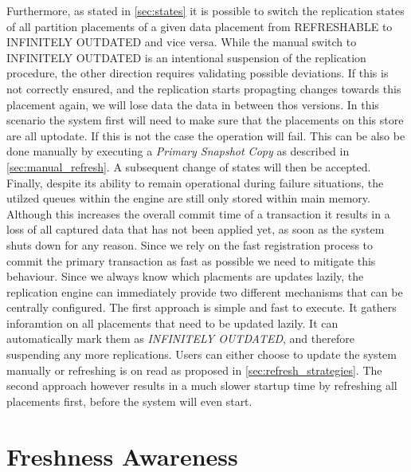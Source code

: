 Furthermore, as stated in \ref{sec:states} it is possible to switch the replication states of all partition placements of a given data placement from REFRESHABLE to 
INFINITELY OUTDATED and vice versa.
While the manual switch to INFINITELY OUTDATED is an intentional suspension of the replication procedure, the other direction requires validating possible deviations.
If this is not correctly ensured, and the replication starts propagting changes towards this placement again, we will lose data the data in between thos versions.
In this scenario the system first will need to make sure that the placements on this store are all uptodate. If this is not the case the operation will fail. 
This can be also be done manually by executing a \emph{Primary Snapshot Copy} as described in \ref{sec:manual_refresh}. A subsequent change of states will then be accepted.\\

Finally, despite its ability to remain operational during failure situations, the utilzed queues within the engine are still only stored within main memory.
Although this increases the overall commit time of a transaction it results in a loss of all captured data that has not been applied yet, as soon as the system 
shuts down for any reason. Since we rely on the fast registration process to commit the primary transaction as fast as possible we need to mitigate this behaviour.
Since we always know which placments are updates lazily, the replication engine can immediately provide two different mechanisms that can be centrally configured. 
The first approach is simple and fast to execute. It gathers inforamtion on all placements that need to be updated lazily. It can automatically mark them as 
\emph{INFINITELY OUTDATED}, 
and therefore suspending any more replications. Users can either choose to update the system manually or refreshing is on read as proposed in \ref{sec:refresh_strategies}.
The second approach however results in a much slower startup time by refreshing all placements first, before the system will even start.









\section{Freshness Awareness}

